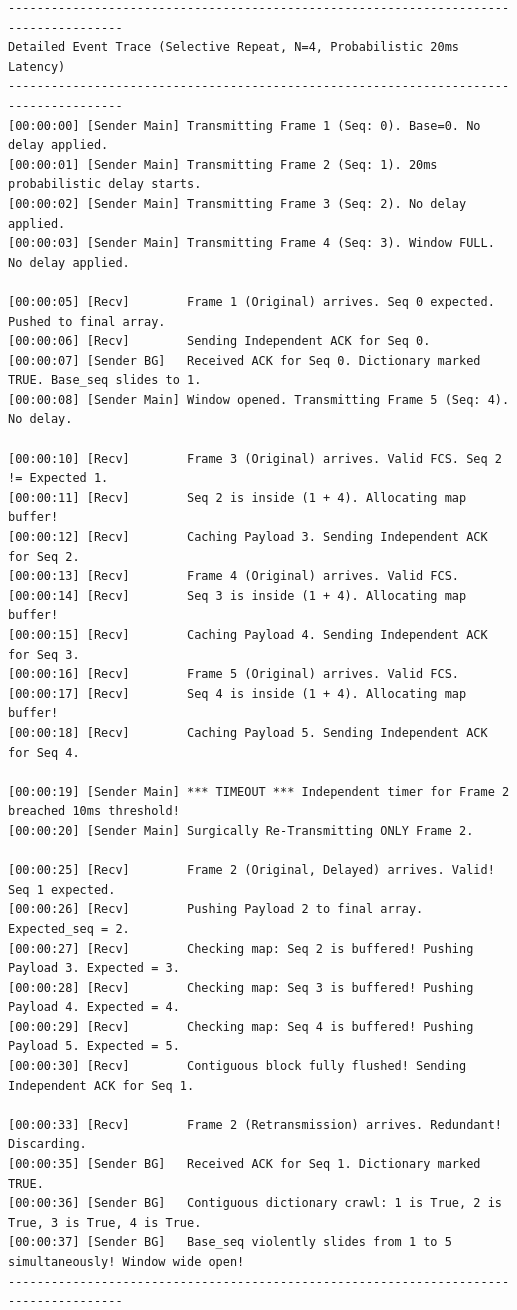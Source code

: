 \documentclass[12pt, a4paper]{article}
\begin{document}
\begin{scriptsize}
\begin{verbatim}
--------------------------------------------------------------------------------------
Detailed Event Trace (Selective Repeat, N=4, Probabilistic 20ms Latency)
--------------------------------------------------------------------------------------
[00:00:00] [Sender Main] Transmitting Frame 1 (Seq: 0). Base=0. No delay applied.
[00:00:01] [Sender Main] Transmitting Frame 2 (Seq: 1). 20ms probabilistic delay starts.
[00:00:02] [Sender Main] Transmitting Frame 3 (Seq: 2). No delay applied.
[00:00:03] [Sender Main] Transmitting Frame 4 (Seq: 3). Window FULL. No delay applied.

[00:00:05] [Recv]        Frame 1 (Original) arrives. Seq 0 expected. Pushed to final array.
[00:00:06] [Recv]        Sending Independent ACK for Seq 0.
[00:00:07] [Sender BG]   Received ACK for Seq 0. Dictionary marked TRUE. Base_seq slides to 1.
[00:00:08] [Sender Main] Window opened. Transmitting Frame 5 (Seq: 4). No delay.

[00:00:10] [Recv]        Frame 3 (Original) arrives. Valid FCS. Seq 2 != Expected 1.
[00:00:11] [Recv]        Seq 2 is inside (1 + 4). Allocating map buffer!
[00:00:12] [Recv]        Caching Payload 3. Sending Independent ACK for Seq 2.
[00:00:13] [Recv]        Frame 4 (Original) arrives. Valid FCS.
[00:00:14] [Recv]        Seq 3 is inside (1 + 4). Allocating map buffer!
[00:00:15] [Recv]        Caching Payload 4. Sending Independent ACK for Seq 3.
[00:00:16] [Recv]        Frame 5 (Original) arrives. Valid FCS.
[00:00:17] [Recv]        Seq 4 is inside (1 + 4). Allocating map buffer!
[00:00:18] [Recv]        Caching Payload 5. Sending Independent ACK for Seq 4.

[00:00:19] [Sender Main] *** TIMEOUT *** Independent timer for Frame 2 breached 10ms threshold!
[00:00:20] [Sender Main] Surgically Re-Transmitting ONLY Frame 2.

[00:00:25] [Recv]        Frame 2 (Original, Delayed) arrives. Valid! Seq 1 expected.
[00:00:26] [Recv]        Pushing Payload 2 to final array. Expected_seq = 2.
[00:00:27] [Recv]        Checking map: Seq 2 is buffered! Pushing Payload 3. Expected = 3.
[00:00:28] [Recv]        Checking map: Seq 3 is buffered! Pushing Payload 4. Expected = 4.
[00:00:29] [Recv]        Checking map: Seq 4 is buffered! Pushing Payload 5. Expected = 5.
[00:00:30] [Recv]        Contiguous block fully flushed! Sending Independent ACK for Seq 1.

[00:00:33] [Recv]        Frame 2 (Retransmission) arrives. Redundant! Discarding.
[00:00:35] [Sender BG]   Received ACK for Seq 1. Dictionary marked TRUE.
[00:00:36] [Sender BG]   Contiguous dictionary crawl: 1 is True, 2 is True, 3 is True, 4 is True.
[00:00:37] [Sender BG]   Base_seq violently slides from 1 to 5 simultaneously! Window wide open!
--------------------------------------------------------------------------------------
\end{verbatim}
\end{scriptsize}
\end{document}
